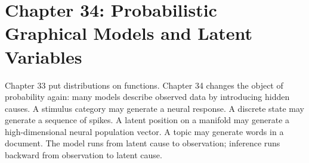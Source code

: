\section{Chapter 34: Probabilistic Graphical Models and Latent Variables}
\label{ch:graphical-models-latent-variables}

Chapter 33 put distributions on functions. Chapter 34 changes the object of probability again: many models describe observed data by introducing hidden causes. A stimulus category may generate a neural response. A discrete state may generate a sequence of spikes. A latent position on a manifold may generate a high-dimensional neural population vector. A topic may generate words in a document. The model runs from latent cause to observation; inference runs backward from observation to latent cause.

